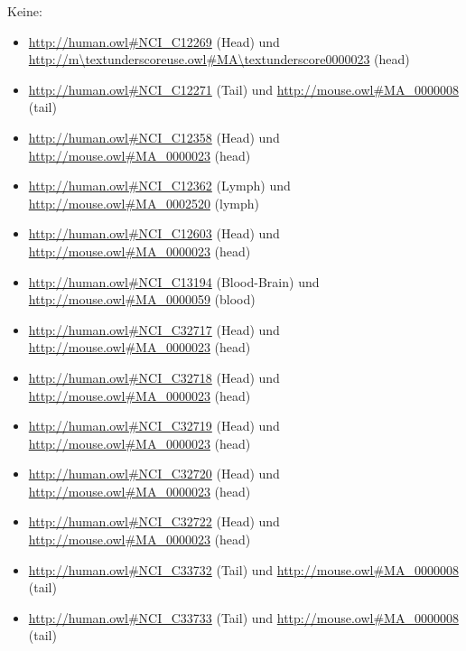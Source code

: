 Keine:
\begin{itemize}
	\item \url{http://human.owl#NCI_C12269} (Head\textunderscoreof\textunderscorethe\textunderscorePancreas) und \url{http://m\textunderscoreuse.owl#MA\textunderscore0000023} (head)
	\item \url{http://human.owl#NCI_C12271} (Tail\textunderscoreof\textunderscorethe\textunderscorePancreas) und \url{http://mouse.owl#MA_0000008} (tail)
	\item \url{http://human.owl#NCI_C12358} (Head\textunderscoreund\textunderscoreNeck\textunderscoreLymph\textunderscoreNode) und \url{http://mouse.owl#MA_0000023} (head)
	\item \url{http://human.owl#NCI_C12362} (Lymph\textunderscoreNode\textunderscoreof\textunderscoreInguinal\textunderscoreRegion\textunderscoreor\textunderscoreLeg) und \url{http://mouse.owl#MA_0002520} (lymph)
	\item \url{http://human.owl#NCI_C12603} (Head\textunderscoreof\textunderscorethe\textunderscoreSpermatozoon) und \url{http://mouse.owl#MA_0000023} (head)
	\item \url{http://human.owl#NCI_C13194} (Blood-Brain\textunderscoreBarrier) und \url{http://mouse.owl#MA_0000059} (blood)
	\item \url{http://human.owl#NCI_C32717} (Head\textunderscoreof\textunderscorethe\textunderscoreEpididymis) und \url{http://mouse.owl#MA_0000023} (head)
	\item \url{http://human.owl#NCI_C32718} (Head\textunderscoreof\textunderscorethe\textunderscoreFemur) und \url{http://mouse.owl#MA_0000023} (head)
	\item \url{http://human.owl#NCI_C32719} (Head\textunderscoreof\textunderscorethe\textunderscoreFibula) und \url{http://mouse.owl#MA_0000023} (head)
	\item \url{http://human.owl#NCI_C32720} (Head\textunderscoreof\textunderscorethe\textunderscoreHumerus) und \url{http://mouse.owl#MA_0000023} (head)
	\item \url{http://human.owl#NCI_C32722} (Head\textunderscoreof\textunderscorethe\textunderscoreTibia) und \url{http://mouse.owl#MA_0000023} (head)
	\item \url{http://human.owl#NCI_C33732} (Tail\textunderscoreof\textunderscorethe\textunderscoreEpididymis) und \url{http://mouse.owl#MA_0000008} (tail)
	\item \url{http://human.owl#NCI_C33733} (Tail\textunderscoreof\textunderscorethe\textunderscoreSpermatozoon) und \url{http://mouse.owl#MA_0000008} (tail)
\end{itemize}
